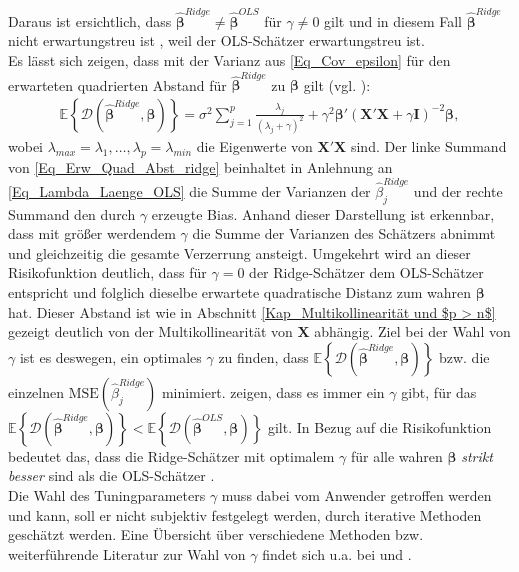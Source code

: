 \documentclass[12pt, a4paper]{report}\usepackage[]{graphicx}\usepackage[]{color}
\begin{document}
Daraus ist ersichtlich, dass $\boldsymbol{\hat{\beta}}^{Ridge} \ne \boldsymbol{\hat{\beta}}^{OLS}$ für $\gamma \ne 0$ gilt und in diesem Fall $\boldsymbol{\hat{\beta}}^{Ridge}$ nicht erwartungstreu ist \cite{seber2003linear}, weil der OLS-Schätzer erwartungstreu ist.\\ 
Es lässt sich zeigen, dass mit der Varianz aus \eqref{Eq_Cov_epsilon} für den erwarteten quadrierten Abstand für $\boldsymbol{\hat{\beta}}^{Ridge}$ zu $\boldsymbol{\beta}$ gilt (vgl. ):
\begin{align}\label{Eq_Erw_Quad_Abst_ridge}
\mathbb{E} \left\lbrace \mathcal{D}(\boldsymbol{\hat{\beta}}^{Ridge},\boldsymbol{\beta}) \right\rbrace=\sigma^2 \sum_{j=1}^{p} \frac{\lambda_j}{(\lambda_j + \gamma)^2} + \gamma^2 \boldsymbol{\beta}' (\mathbf{X}'\mathbf{X}+ \gamma \mathbf{I})^{-2}\boldsymbol{\beta},
\end{align}
wobei $\lambda_{max}= \lambda_1, \dots, \lambda_p= \lambda_{min}$ die Eigenwerte von $\mathbf{X}'\mathbf{X}$ sind. Der linke Summand von \eqref{Eq_Erw_Quad_Abst_ridge} beinhaltet in Anlehnung an \eqref{Eq_Lambda_Laenge_OLS} die Summe der Varianzen der $\hat{\beta}_j^{Ridge}$ und der rechte Summand den durch $\gamma$ erzeugte Bias. Anhand dieser Darstellung ist erkennbar, dass mit größer werdendem $\gamma$ die Summe der Varianzen des Schätzers abnimmt und gleichzeitig die gesamte Verzerrung ansteigt. Umgekehrt wird an dieser Risikofunktion deutlich, dass für $\gamma=0$ der Ridge-Schätzer dem OLS-Schätzer entspricht und folglich dieselbe erwartete quadratische Distanz zum wahren $\boldsymbol{\beta}$ hat. Dieser Abstand ist wie in Abschnitt \ref{Kap_Multikollinearität und $p > n$} gezeigt deutlich von der Multikollinearität von $\mathbf{X}$ abhängig. Ziel bei der Wahl von $\gamma$ ist es deswegen, ein optimales $\gamma$ zu finden, dass $\mathbb{E} \left\lbrace \mathcal{D}(\boldsymbol{\hat{\beta}}^{Ridge},\boldsymbol{\beta}) \right\rbrace$ bzw. die einzelnen $\text{MSE}(\hat{\beta}_j^{Ridge})$ minimiert.  zeigen, dass es immer ein $\gamma$ gibt, für das $\mathbb{E} \left\lbrace \mathcal{D}(\boldsymbol{\hat{\beta}}^{Ridge},\boldsymbol{\beta}) \right\rbrace < \mathbb{E} \left\lbrace \mathcal{D}(\boldsymbol{\hat{\beta}}^{OLS},\boldsymbol{\beta}) \right\rbrace$ gilt. In Bezug auf die Risikofunktion bedeutet das, dass die Ridge-Schätzer mit optimalem $\gamma$ für alle wahren $\boldsymbol{\beta}$ \textit{strikt besser} sind als die OLS-Schätzer \cite{gross2003linear}.\\
Die Wahl des Tuningparameters $\gamma$ muss dabei vom Anwender getroffen werden und kann, soll er nicht subjektiv festgelegt werden, durch iterative Methoden geschätzt werden. Eine Übersicht über verschiedene Methoden bzw. weiterführende Literatur zur Wahl von $\gamma$ findet sich u.a. bei  und .
\end{document}
